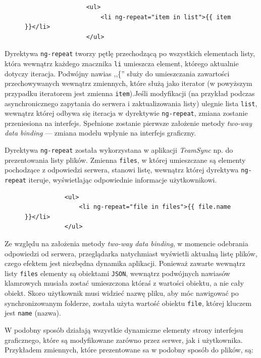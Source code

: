\begin{figure}[htb]
\begin{verbatim}
                 <ul>
                     <li ng-repeat="item in list">{{ item }}</li>
                 </ul>
\end{verbatim}
\end{figure}

Dyrektywa \texttt{ng-repeat} tworzy pętlę przechodzącą po wszystkich elementach listy, która wewnątrz każdego znacznika \texttt{li} umieszcza element, którego aktualnie dotyczy iteracja. Podwójny nawias ,,\{'' służy do umieszczania zawartości przechowywanych wewnątrz zmiennych, które służą jako iterator (w powyższym przypadku iteratorem jest zmienna \texttt{item}).Jeśli modyfikacji (na przykład podczas asynchronicznego zapytania do serwera i zaktualizowania listy) ulegnie lista \texttt{list}, wewnątrz której odbywa się iteracja w dyrektywie \texttt{ng-repeat}, zmiana zostanie przeniesiona na interfejs. Spełnione zostanie pierwsze założenie metody \emph{two-way data binding} --- zmiana modelu wpłynie na interfejs graficzny.

Dyrektywa \texttt{ng-repeat} została wykorzystana w aplikacji \emph{TeamSync} np. do prezentowania listy plików. Zmienna \texttt{files}, w której umieszczane są elementy pochodzące z odpowiedzi serwera, stanowi listę, wewnątrz której dyrektywa \texttt{ng-repeat} iteruje, wyświetlając odpowiednie informacje użytkownikowi.

\begin{figure}[htb]
\begin{verbatim}
           <ul>
               <li ng-repeat="file in files">{{ file.name }}</li>
           </ul>
\end{verbatim}
\end{figure}

Ze względu na założenia metody \emph{two-way data binding}, w momencie odebrania odpowiedzi od serwera, przeglądarka natychmiast wyświetli aktualną listę plików, czego efektem jest niezbędna dynamika aplikacji. Ponieważ zawarte wewnątrz listy \texttt{files} elementy są obiektami \texttt{JSON}, wewnątrz podwójnych nawiasów klamrowych musiała zostać umieszczona któraś z wartości obiektu, a nie cały obiekt. Skoro użytkownik musi widzieć nazwę pliku, aby móc nawigować po synchronizowanym folderze, została użyta wartość obiektu \texttt{file}, której kluczem jest \texttt{name} (nazwa).

W podobny sposób działają wszystkie dynamiczne elementy strony interfejsu graficznego, które są modyfikowane zarówno przez serwer, jak i użytkownika. Przykładem zmiennych, które prezentowane sa w podobny sposób do plików, są:

